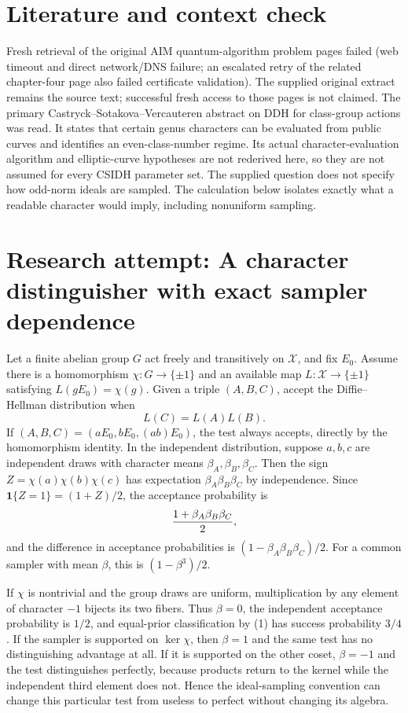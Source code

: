 \documentclass[11pt]{article}
\begin{document}
\section{Literature and context check}
Fresh retrieval of the original AIM quantum-algorithm problem pages failed (web timeout and direct network/DNS failure; an escalated retry of the related chapter-four page also failed certificate validation). The supplied original extract remains the source text; successful fresh access to those pages is not claimed. The primary Castryck--Sotakova--Vercauteren abstract on DDH for class-group actions was read. It states that certain genus characters can be evaluated from public curves and identifies an even-class-number regime. Its actual character-evaluation algorithm and elliptic-curve hypotheses are not rederived here, so they are not assumed for every CSIDH parameter set. The supplied question does not specify how odd-norm ideals are sampled. The calculation below isolates exactly what a readable character would imply, including nonuniform sampling.
\section{Research attempt: A character distinguisher with exact sampler dependence}
Let a finite abelian group $G$ act freely and transitively on $\mathcal X$, and fix $E_0$. Assume there is a homomorphism $\chi:G\to\{\pm1\}$ and an available map $L:\mathcal X\to\{\pm1\}$ satisfying $L(gE_0)=\chi(g)$. Given a triple $(A,B,C)$, accept the Diffie--Hellman distribution when
\[
 L(C)=L(A)L(B).                                      \tag{1}
\]
If $(A,B,C)=(aE_0,bE_0,(ab)E_0)$, the test always accepts, directly by the homomorphism identity. In the independent distribution, suppose $a,b,c$ are independent draws with character means $\beta_A,\beta_B,\beta_C$. Then the sign $Z=\chi(a)\chi(b)\chi(c)$ has expectation $\beta_A\beta_B\beta_C$ by independence. Since $\mathbf1\{Z=1\}=(1+Z)/2$, the acceptance probability is
\[
 {1+\beta_A\beta_B\beta_C\over2},
\]
and the difference in acceptance probabilities is $(1-\beta_A\beta_B\beta_C)/2$. For a common sampler with mean $\beta$, this is $(1-\beta^3)/2$.

If $\chi$ is nontrivial and the group draws are uniform, multiplication by any element of character $-1$ bijects its two fibers. Thus $\beta=0$, the independent acceptance probability is $1/2$, and equal-prior classification by (1) has success probability $3/4$. If the sampler is supported on $\ker\chi$, then $\beta=1$ and the same test has no distinguishing advantage at all. If it is supported on the other coset, $\beta=-1$ and the test distinguishes perfectly, because products return to the kernel while the independent third element does not. Hence the ideal-sampling convention can change this particular test from useless to perfect without changing its algebra.
\end{document}
